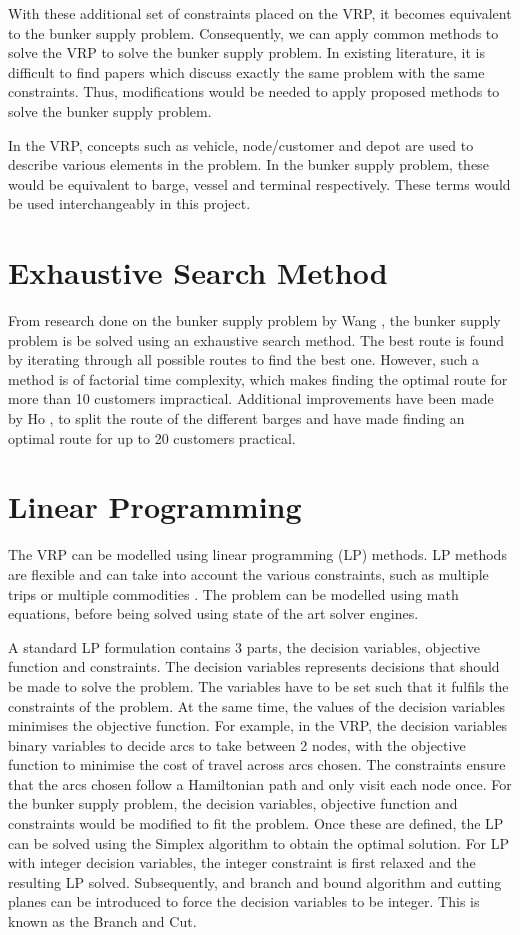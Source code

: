 With these additional set of constraints placed on the VRP, it becomes equivalent to the bunker supply problem. Consequently, we can apply common methods to solve the VRP to solve the bunker supply problem. In existing literature, it is difficult to find papers which discuss exactly the same problem with the same constraints. Thus, modifications would be needed to apply proposed methods to solve the bunker supply problem.

In the VRP, concepts such as vehicle, node/customer and depot are used to describe various elements in the problem. In the bunker supply problem, these would be equivalent to barge, vessel and terminal respectively. These terms would be used interchangeably in this project.

\section{Exhaustive Search Method}
From research done on the bunker supply problem by Wang \cite{wang_optimization_2019}, the bunker supply problem is be solved using an exhaustive search method. The best route is found by iterating through all possible routes to find the best one. However, such a method is of factorial time complexity, which makes finding the optimal route for more than 10 customers impractical. Additional improvements have been made by Ho \cite{ho_development_nodate}, to split the route of the different barges and have made finding an optimal route for up to 20 customers practical.

\section{Linear Programming}
The VRP can be modelled using linear programming (LP) methods. LP methods are flexible and can take into account the various constraints, such as multiple trips \cite{cattaruzza_vehicle_2018} or multiple commodities \cite{gu_vehicle_2024}. The problem can be modelled using math equations, before being solved using state of the art solver engines. 

A standard LP formulation contains 3 parts, the decision variables, objective function and constraints. The decision variables represents decisions that should be made to solve the problem. The variables have to be set such that it fulfils the constraints of the problem. At the same time, the values of the decision variables minimises the objective function. For example, in the VRP, the decision variables binary variables to decide arcs to take between 2 nodes, with the objective function to minimise the cost of travel across arcs chosen. The constraints ensure that the arcs chosen follow a Hamiltonian path and only visit each node once. For the bunker supply problem, the decision variables, objective function and constraints would be modified to fit the problem. Once these are defined, the LP can be solved using the Simplex algorithm to obtain the optimal solution. For LP with integer decision variables, the integer constraint is first relaxed and the resulting LP solved. Subsequently, and branch and bound algorithm and cutting planes can be introduced to force the decision variables to be integer. This is known as the Branch and Cut.


